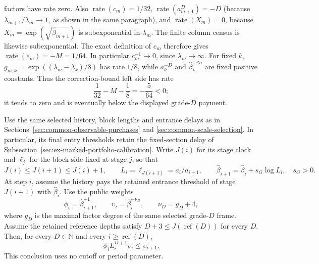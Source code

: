 factors have rate zero. Also $\operatorname{rate}(c_m)=1/32$,
$\operatorname{rate}(a_{m+1}^D)=-D$ (because $\lambda_{m+1}/\lambda_m\to1$, as
shown in the same paragraph), and
$\operatorname{rate}(X_m)=0$, because
$X_m=\exp(\sqrt{\widehat\beta_{m+1}})$ is subexponential in $\lambda_m$.
The finite column census is likewise subexponential. The exact definition
of $e_m$ therefore gives $\operatorname{rate}(e_m)=-M=1/64$.
In particular $c_m^{-1}\to0$, since $\lambda_m\to\infty$.
For fixed $k$, $g_{m,k}=\exp((\lambda_m-\lambda_k)/8)$ has rate $1/8$,
while $a_k^{-D}$ and $\widehat\beta_k^{-\nu_D}$ are fixed positive
constants. Thus the correction-bound left side has rate
\[
 \frac1{32}-M-\frac18=-\frac5{64}<0;
\]
it tends to zero and is eventually below the displayed grade-$D$
payment.

\begin{lemma}
\label{lem:ex-lattice-shell-paid-growth}
Use the same selected history, block lengths and entrance delays as in
Sections~\ref{sec:common-observable-purchases} and
\ref{sec:common-scale-selection}. In particular, its final entry
thresholds retain the fixed-section delay of
Subsection~\ref{sec:ex-marked-portfolio-calibration}. Write $J(i)$ for its
stage clock and $\ell_j$ for the block side fixed at stage $j$, so that
\[
 J(i)\le J(i+1)\le J(i)+1,\qquad
 L_i=\ell_{J(i+1)}=a_i/a_{i+1},\qquad
 \widehat\beta_{i+1}=\widehat\beta_i+s_G\log L_i,
 \quad s_G>0.
\]
At step $i$, assume the history pays the retained entrance threshold of
stage $J(i+1)$ with $\widehat\beta_i$. Use the public weights
\[
 \phi_i=\widehat\beta_{i+1}^{-1},\qquad
 \upsilon_i=\widehat\beta_i^{-\nu_D},\qquad \nu_D=g_D+4,
\]
where $g_D$ is the maximal factor degree of the same selected grade-$D$
frame. Assume the retained reference depths satisfy
$D+3\le J(\operatorname{ref}(D))$ for every $D$. Then, for every $D\in\mathbb N$
and every $i\ge\operatorname{ref}(D)$,
\begin{equation}\label{eq:ex-lattice-shell-growth-input}
 \phi_i L_i^{D+1}\upsilon_i\le\upsilon_{i+1}.
\end{equation}
This conclusion uses no cutoff or period parameter.
\end{lemma}

